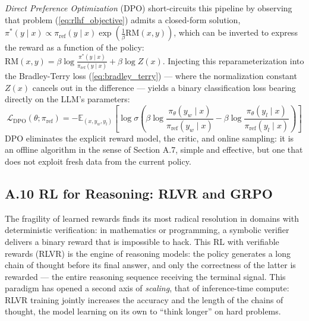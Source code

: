 \documentclass[11pt,a4paper]{article}
\begin{document}
\emph{Direct Preference Optimization} (DPO) \cite{rafailov2024direct} short-circuits this pipeline by observing that problem (\ref{eq:rlhf_objective}) admits a closed-form solution, $\pi^*(y \mid x) \propto \pi_{\text{ref}}(y \mid x) \exp(\frac{1}{\beta}\text{RM}(x,y))$, which can be inverted to express the reward as a function of the policy: $\text{RM}(x, y) = \beta \log \frac{\pi^*(y \mid x)}{\pi_{\text{ref}}(y \mid x)} + \beta \log Z(x)$. Injecting this reparameterization into the Bradley-Terry loss (\ref{eq:bradley_terry}) — where the normalization constant $Z(x)$ cancels out in the difference — yields a binary classification loss bearing directly on the LLM's parameters:
\begin{equation}
\mathcal{L}_{\text{DPO}}(\theta; \pi_{\text{ref}}) = -\mathbb{E}_{(x, y_w, y_l)} \left[ \log \sigma \left( \beta \log \frac{\pi_\theta(y_w \mid x)}{\pi_{\text{ref}}(y_w \mid x)} - \beta \log \frac{\pi_\theta(y_l \mid x)}{\pi_{\text{ref}}(y_l \mid x)} \right) \right]
\end{equation}
DPO eliminates the explicit reward model, the critic, and online sampling: it is an offline algorithm in the sense of Section A.7, simple and effective, but one that does not exploit fresh data from the current policy.

\subsection*{A.10 RL for Reasoning: RLVR and GRPO}
The fragility of learned rewards finds its most radical resolution in domains with deterministic verification: in mathematics or programming, a symbolic verifier delivers a binary reward that is impossible to hack. This RL with verifiable rewards (RLVR) is the engine of reasoning models: the policy generates a long chain of thought before its final answer, and only the correctness of the latter is rewarded — the entire reasoning sequence receiving the terminal signal. This paradigm has opened a second axis of \emph{scaling}, that of inference-time compute: RLVR training jointly increases the accuracy and the length of the chains of thought, the model learning on its own to ``think longer'' on hard problems.
\end{document}
